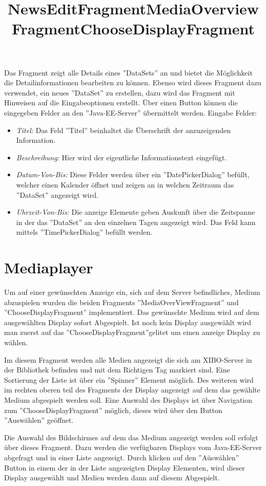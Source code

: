 \title{NewsEditFragment}

Das Fragment zeigt alle Details eines ''DataSets'' an und bietet die Möglichkeit die Detailinformationen bearbeiten zu können. Ebenso wird dieses Fragment dazu verwendet, ein neues ''DataSet'' zu erstellen, dazu wird das Fragment mit Hinweisen auf die Eingabeoptionen erstellt. Über einen Button können die eingegeben Felder an den ''Java-EE-Server'' übermittelt werden. Eingabe Felder:

\begin{itemize}
	\item {\em Titel:} Das Feld ''Titel'' beinhaltet die Überschrift der anzuzeigenden Information.
	\item {\em Beschreibung:} Hier wird der eigentliche Informationstext eingefügt.
	\item{\em Datum-Von-Bis:} Diese Felder werden über ein ''DatePickerDialog'' befüllt, welcher einen Kalender öffnet und zeigen an in welchen Zeitraum das ''DataSet'' angezeigt wird. 
	\item {\em Uhrzeit-Von-Bis:} Die anzeige Elemente geben Auskunft über die Zeitspanne in der das ''DataSet'' an den einzelnen Tagen angezeigt wird. Das Feld kann mittels ''TimePickerDialog'' befüllt werden.		
\end{itemize}



\section{Mediaplayer}
Um auf einer gewünschten Anzeige ein, sich auf dem Server befindliches, Medium abzuspielen wurden die beiden Fragments ''MediaOverViewFragment'' und ''ChooseDisplayFragment'' implementiert. Das gewünschte Medium wird auf dem ausgewählten Display sofort Abgespielt. Ist noch kein Display ausgewählt wird man zuerst auf das ''ChooseDisplayFragment''gelitet um einen anzeige Display zu wählen.

\title{MediaOverviewFragment}
Im diesem Fragment werden alle Medien angezeigt die sich am XIBO-Server in der Bibliothek befinden und mit dem Richtigen Tag markiert sind. Eine Sortierung der Liste ist über ein ''Spinner'' Element möglich. Des weiteren wird im rechten oberen teil des Fragments der Display angezeigt auf dem das gewählte Medium abgespielt werden soll. Eine Auswahl des Displays ist über Navigation zum ''ChooseDisplayFragment'' möglich, dieses wird über den Button ''Auswählen'' geöffnet.


\title{ChooseDisplayFragment}
Die Auswahl des Bildschirmes auf dem das Medium angezeigt werden soll erfolgt über dieses Fragment. Dazu werden die verfügbaren Displays vom Java-EE-Server abgefragt und in einer Liste angezeigt. Durch klicken auf den ''Aüswählen'' Button in einem der in der Liste angezeigten Display Elementen, wird dieser Display ausgewählt und Medien werden dann auf diesem Abgespielt. 



